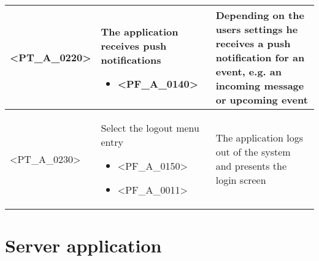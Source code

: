 \begin{longtable} {| p{} | p{} | p{} |}
    <PT\_A\_0220> & 
    The application receives push notifications
        \begin{itemize}
            \item <PF\_A\_0140>
        \end{itemize} & 
    Depending on the users settings he receives a push notification for an event, e.g. an incoming message or upcoming event \\ \hline
    
    <PT\_A\_0230> & 
    Select the logout menu entry
        \begin{itemize}
            \item <PF\_A\_0150>
            \item <PF\_A\_0011>
        \end{itemize} & 
    The application logs out of the system and presents the login screen \\ \hline
    
\end{longtable}

\section{Server application}

